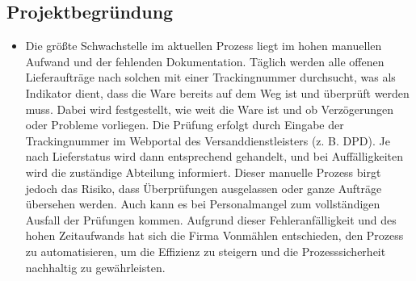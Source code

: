 \subsection{Projektbegründung} 
\label{sec:Projektbegruendung}
\begin{itemize}
	\item Die größte Schwachstelle im aktuellen Prozess liegt im hohen manuellen Aufwand und der fehlenden Dokumentation. Täglich werden alle offenen Lieferaufträge nach solchen mit einer Trackingnummer durchsucht, was als Indikator dient, dass die Ware bereits auf dem Weg ist und überprüft werden muss. Dabei wird festgestellt, wie weit die Ware ist und ob Verzögerungen oder Probleme vorliegen.
	Die Prüfung erfolgt durch Eingabe der Trackingnummer im Webportal des Versanddienstleisters (z. B. DPD). Je nach Lieferstatus wird dann entsprechend gehandelt, und bei Auffälligkeiten wird die zuständige Abteilung informiert. Dieser manuelle Prozess birgt jedoch das Risiko, dass Überprüfungen ausgelassen oder ganze Aufträge übersehen werden. Auch kann es bei Personalmangel zum vollständigen Ausfall der Prüfungen kommen.
	Aufgrund dieser Fehleranfälligkeit und des hohen Zeitaufwands hat sich die Firma Vonmählen entschieden, den Prozess zu automatisieren, um die Effizienz zu steigern und die Prozesssicherheit nachhaltig zu gewährleisten.
	
\end{itemize}



